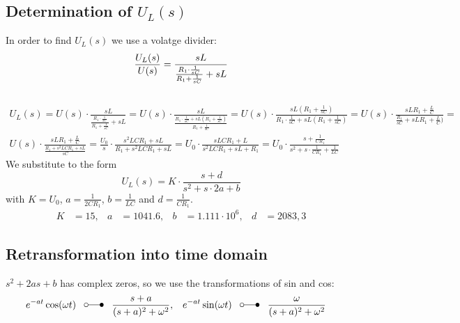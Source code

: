 \documentclass[a4paper]{article}
\begin{document}
\subsection{Determination of $U_L(s)$}
In order to find $U_L(s)$ we use a volatge divider:
\begin{equation*}
	\frac{U_L(s)}{U(s)} = \frac{sL}{\frac{R_1 \cdot \frac{1}{sC}}{R_1 + \frac{1}{sC}} + sL}\\
\end{equation*}
\\
\begin{align*}
	U_L(s) = U(s) \cdot \frac{sL}{\frac{R_1 \cdot \frac{1}{sC}}{R_1 + \frac{1}{sC}} + sL} = 
	U(s) \cdot \frac{sL}{\frac{R_1 \cdot \frac{1}{sC} + sL(R_1 + \frac{1}{sC})}{R_1 + \frac{1}{sC}}} = 
	U(s) \cdot \frac{sL(R_1 + \frac{1}{sC})}{R_1 \cdot \frac{1}{sC} + sL(R_1 + \frac{1}{sC})} =
	U(s) \cdot \frac{sLR_1 + \frac{L}{C}}{\frac{R_1}{sC} + sLR_1 + \frac{L}{C})} =\\
	U(s) \cdot \frac{sLR_1 + \frac{L}{C}}{\frac{R_1 + s^2LCR_1 + sL}{sC}} =
	\frac{U_0}{s} \cdot \frac{s^2LCR_1 + sL}{R_1 + s^2LCR_1 + sL} =
	U_0 \cdot \frac{sLCR_1 + L}{s^2LCR_1 + sL + R_1} =
	U_0 \cdot \frac{s + \frac{1}{CR_1}}{s^2 + s \cdot \frac{1}{CR_1} + \frac{1}{LC}}
\end{align*}
We substitute to the form
\begin{equation*}
	U_L(s) = K\cdot \frac{s+d}{s^2+s\cdot 2a+b}
\end{equation*}
with $K = U_0$, $a = \frac{1}{2CR_1}$, $b = \frac{1}{LC}$ and  $d = \frac{1}{CR_1}$.
\begin{align*}
	K &= 15,& a &= 1041.6,& b &= 1.111 \cdot 10^{6},& d &= 2083,3
\end{align*}

\pagebreak

\subsection{Retransformation into time domain}
$s^2 + 2as + b$ has complex zeros, so we use the transformations of sin and cos:
\begin{align*}
	e^{-at}\cos(\omega t)\;\;\; &\laplace \;\;\; \frac{s+a}{(s+a)^2 + \omega^2},&
	e^{-at}\sin(\omega t)\;\;\; &\laplace \;\;\; \frac{\omega}{(s+a)^2 + \omega^2}
\end{align*}
\end{document}
